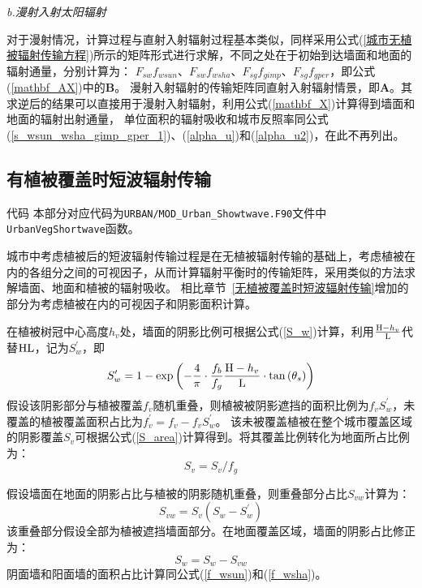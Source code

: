 \textit{b.漫射入射太阳辐射}

对于漫射情况，计算过程与直射入射辐射过程基本类似，同样采用公式(\ref{城市无植被辐射传输方程})所示的矩阵形式进行求解，不同之处在于初始到达墙面和地面的辐射通量，分别计算为：
$F_{sw}f_{wsun}$、$F_{sw}f_{wsha}$、$F_{sg}f_{gimp}$、$F_{sg}f_{gper}$，即公式(\ref{mathbf_AX})中的$\mathbf{B}$。
漫射入射辐射的传输矩阵同直射入射辐射情景，即$\mathbf{A}$。其求逆后的结果可以直接用于漫射入射辐射，利用公式(\ref{mathbf_X})计算得到墙面和地面的辐射出射通量，
单位面积的辐射吸收和城市反照率同公式(\ref{s_wsun_wsha_gimp_gper_1})、(\ref{alpha_u})和(\ref{alpha_u2})，在此不再列出。

\subsection{有植被覆盖时短波辐射传输}\label{有植被覆盖时短波辐射传输}
\begin{mymdframed}{代码}
本部分对应代码为\texttt{URBAN/MOD\_Urban\_Showtwave.F90}文件中\texttt{UrbanVegShortwave}函数。
\end{mymdframed}

城市中考虑植被后的短波辐射传输过程是在无植被辐射传输的基础上，考虑植被在内的各组分之间的可视因子，从而计算辐射平衡时的传输矩阵，采用类似的方法求解墙面、地面和植被的辐射吸收。
相比章节~\ref{无植被覆盖时短波辐射传输}增加的部分为考虑植被在内的可视因子和阴影面积计算。

在植被树冠中心高度$h_v$处，墙面的阴影比例可根据公式(\ref{S_w})计算，利用$\frac{{\rm H}-h_v}{\rm L}$代替$\rm HL$，记为$S_w^\prime$，即
\begin{equation}
S_{w}^{\prime}=1-\exp \left(-\frac{4}{\pi} \cdot \frac{f_{b}}{f_{g}} \frac{{\rm H}-h_{v}}{\rm L} \cdot \tan \left(\theta_{s}\right)\right)
\end{equation}
假设该阴影部分与植被覆盖$f_v$随机重叠，则植被被阴影遮挡的面积比例为$f_vS_w^\prime$，未覆盖的植被覆盖面积占比为$f_v^\prime=f_v-f_vS_w^\prime$。
该未被覆盖植被在整个城市覆盖区域的阴影覆盖$S_v$可根据公式(\ref{S_area})计算得到。将其覆盖比例转化为地面所占比例为：
\begin{equation}\label{S_v2}
S_{v}=S_{v} / f_{g}
\end{equation}

假设墙面在地面的阴影占比与植被的阴影随机重叠，则重叠部分占比$S_{vw}$计算为：
\begin{equation}
S_{v w}=S_{v}\left(S_{w}-S_{w}^{\prime}\right)
\end{equation}
该重叠部分假设全部为植被遮挡墙面部分。在地面覆盖区域，墙面的阴影占比修正为：
\begin{equation}\label{S_w2}
S_{w}=S_{w}-S_{v w}
\end{equation}
阴面墙和阳面墙的面积占比计算同公式(\ref{f_wsun})和(\ref{f_wsha})。

